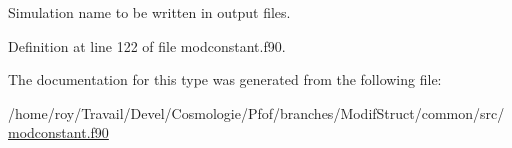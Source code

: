 Simulation name to be written in output files. 



Definition at line 122 of file modconstant.\-f90.



The documentation for this type was generated from the following file\-:\begin{DoxyCompactItemize}
\item 
/home/roy/\-Travail/\-Devel/\-Cosmologie/\-Pfof/branches/\-Modif\-Struct/common/src/\hyperlink{modconstant_8f90}{modconstant.\-f90}\end{DoxyCompactItemize}
